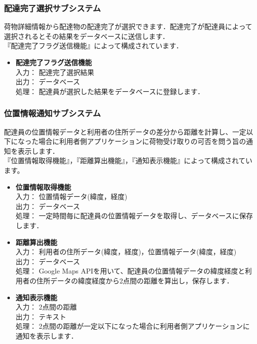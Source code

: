 \documentclass[a4j,titlepage]{jarticle}
\begin{document}
\subsubsection{配達完了選択サブシステム}
荷物詳細情報から配達物の配達完了が選択できます．配達完了が配達員によって選択されるとその結果をデータベースに送信します．\\
『配達完了フラグ送信機能』によって構成されています．
\begin{itemize}
\item \textbf{配達完了フラグ送信機能} \\
入力： 配達完了選択結果\\
出力： データベース \\
処理： 配達員が選択した結果をデータベースに登録します．
\end{itemize}

\subsubsection{位置情報通知サブシステム}
配達員の位置情報データと利用者の住所データの差分から距離を計算し、一定以下になった場合に利用者側アプリケーションに荷物受け取りの可否を問う旨の通知を表示します．\\
『位置情報取得機能』，『距離算出機能』，『通知表示機能』によって構成されています。
\begin{itemize}
\item \textbf{位置情報取得機能} \\
入力： 位置情報データ(緯度，経度) \\
出力： データベース \\
処理： 一定時間毎に配達員の位置情報データを取得し、データベースに保存します．
\item \textbf{距離算出機能} \\
入力： 利用者の住所データ(緯度，経度)，位置情報データ(緯度，経度) \\
出力： データベース \\
処理： Google Maps APIを用いて、配達員の位置情報データの緯度経度と利用者の住所データの緯度経度から2点間の距離を算出し，保存します．
\item \textbf{通知表示機能} \\
入力： 2点間の距離 \\
出力： テキスト \\
処理： 2点間の距離が一定以下になった場合に利用者側アプリケーションに通知を表示します．
\end{itemize}
\end{document}
